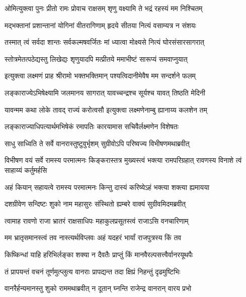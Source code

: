 \twolineshloka
{ओमित्युक्त्वा पुनः प्रीतो रामः प्रोवाच राक्षसम्}
{शृणु वक्ष्यामि ते भद्रं रहस्यं मम निश्चितम्} %

\twolineshloka
{मद्भक्तानां प्रशान्तानां योगिनां वीतरागिणाम्}
{हृदये सीतया नित्यं वसाम्यत्र न संशयः} %

\twolineshloka
{तस्मात् त्वं सर्वदा शान्तः सर्वकल्मषवर्जितः}
{मां ध्यात्वा मोक्ष्यसे नित्यं घोरसंसारसागरात्} %

\twolineshloka
{स्तोत्रमेतत्पठेद्यस्तु लिखेद्यः शृणुयादपि}
{मत्प्रीतये ममाभीष्टं सारूप्यं समवाप्नुयात्} %

\twolineshloka
{इत्युक्त्वा लक्ष्मणं प्राह श्रीरामो भक्तभक्तिमान्}
{पश्यत्विदानीमेवैष मम सन्दर्शने फलम्} %

\twolineshloka
{लङ्काराज्येऽभिषेक्ष्यामि जलमानय सागरात्}
{यावच्चन्द्रश्च सूर्यश्च यावत् तिष्ठति मेदिनी} %

\twolineshloka
{यावन्मम कथा लोके तावद् राज्यं करोत्वसौ}
{इत्युक्त्वा लक्ष्मणेनाम्बु ह्यानाय्य कलशेन तम्} %

\twolineshloka
{लङ्काराज्याधिपत्यार्थमभिषेकं रमापतिः}
{कारयामास सचिवैर्लक्ष्मणेन विशेषतः} %

\twolineshloka
{साधु साध्विति ते सर्वे वानरास्तुष्टुवुर्भृशम्}
{सुग्रीवोऽपि परिष्वज्य विभीषणमथाब्रवीत्} %

\threelineshloka
{विभीषण वयं सर्वे रामस्य परमात्मनः}
{किङ्करास्तत्र मुख्यस्त्वं भक्त्या रामपरिग्रहात्}
{रावणस्य विनाशे त्वं साहाय्यं कर्तुमर्हसि} %


\twolineshloka
{अहं कियान् सहायत्वे रामस्य परमात्मनः}
{किन्तु दास्यं करिष्येऽहं भक्त्या शक्त्या ह्यमायया} %

\twolineshloka
{दशग्रीवेण सन्दिष्टः शुको नाम महासुरः}
{संस्थितो ह्यम्बरे वाक्यं सुग्रीवमिदमब्रवीत्} %

\twolineshloka
{त्वामाह रावणो राजा भ्रातरं राक्षसाधिपः}
{महाकुलप्रसूतस्त्वं राजाऽसि वनचारिणाम्} %

\twolineshloka
{मम भ्रातृसमानस्त्वं तव नास्त्यर्थविप्लवः}
{अहं यदहरं भार्यां राजपुत्रस्य किं तव} %

\twolineshloka
{किष्किन्धां याहि हरिभिर्लङ्का शक्या न दैवतैः}
{प्राप्तुं किं मानवैरल्पसत्त्वैर्वानरयूथपैः} %

\twolineshloka
{तं प्रापयन्तं वचनं तूर्णमुत्प्लुत्य वानराः}
{प्रापद्यन्त तदा क्षिप्रं निहन्तुं दृढमुष्टिभिः} %

\twolineshloka
{वानरैर्हन्यमानस्तु शुको राममथाब्रवीत्}
{न दूतान् घ्नन्ति राजेन्द्र वानरान् वारय प्रभो} %

